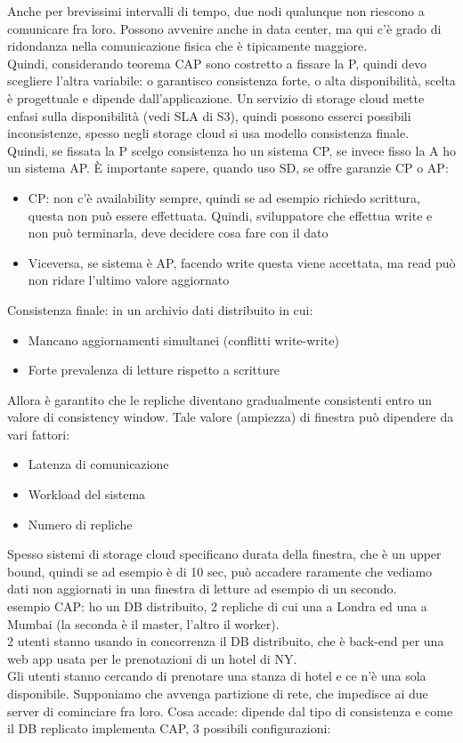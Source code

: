 \documentclass{article}
\begin{document}
Anche per brevissimi intervalli di tempo, due nodi qualunque non riescono a comunicare fra loro. Possono avvenire anche in data center, ma qui c'è grado di ridondanza nella comunicazione fisica che è tipicamente maggiore.\\ Quindi, considerando teorema CAP sono costretto a fissare la P, quindi devo scegliere l'altra variabile: o garantisco consistenza forte, o alta disponibilità, scelta è progettuale e dipende dall'applicazione. Un servizio di storage cloud mette enfasi sulla disponibilità (vedi SLA di S3), quindi possono esserci possibili inconsistenze, spesso negli storage cloud si usa modello consistenza finale.\\ Quindi, se fissata la P scelgo consistenza ho un sistema CP, se invece fisso la A ho un sistema AP. È importante sapere, quando uso SD, se offre garanzie CP o AP:
\begin{itemize}
\item CP: non c'è availability sempre, quindi se ad esempio richiedo scrittura, questa non può essere effettuata. Quindi, sviluppatore che effettua write e non può terminarla, deve decidere cosa fare con il dato
\item Viceversa, se sistema è AP, facendo write questa viene accettata, ma read può non ridare l'ultimo valore aggiornato
\end{itemize}
Consistenza finale: in un archivio dati distribuito in cui:
\begin{itemize}
\item Mancano aggiornamenti simultanei (conflitti write-write)
\item Forte prevalenza di letture rispetto a scritture
\end{itemize}
Allora è garantito che le repliche diventano gradualmente consistenti entro un valore di consistency window. Tale valore (ampiezza) di finestra può dipendere da vari fattori:
\begin{itemize}
\item Latenza di comunicazione
\item Workload del sistema
\item Numero di repliche
\end{itemize}
Spesso sistemi di storage cloud specificano durata della finestra, che è un upper bound, quindi se ad esempio è di 10 sec, può accadere raramente che vediamo dati non aggiornati in una finestra di letture ad esempio di un secondo.\\ esempio CAP: ho un DB distribuito, 2 repliche di cui una a Londra ed una a Mumbai (la seconda è il master, l'altro il worker).\\ 2 utenti stanno usando in concorrenza il DB distribuito, che è back-end per una web app usata per le prenotazioni di un hotel di NY.\\ Gli utenti stanno cercando di prenotare una stanza di hotel e ce n'è una sola disponibile. Supponiamo che avvenga partizione di rete, che impedisce ai due server di cominciare fra loro. Cosa accade: dipende dal tipo di consistenza e come il DB replicato implementa CAP, 3 possibili configurazioni:
\end{document}
